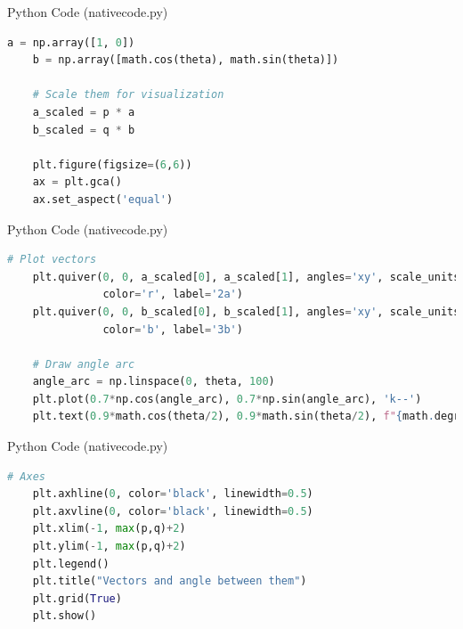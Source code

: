 \documentclass{beamer}
\begin{document}
\begin{frame}[fragile]{Python Code (nativecode.py)}
\begin{lstlisting}[language=Python]
    a = np.array([1, 0])
    b = np.array([math.cos(theta), math.sin(theta)])

    # Scale them for visualization
    a_scaled = p * a
    b_scaled = q * b

    plt.figure(figsize=(6,6))
    ax = plt.gca()
    ax.set_aspect('equal')

\end{lstlisting}
\end{frame}
\begin{frame}[fragile]{Python Code (nativecode.py)}
\begin{lstlisting}[language=Python]
# Plot vectors
    plt.quiver(0, 0, a_scaled[0], a_scaled[1], angles='xy', scale_units='xy', scale=1,
               color='r', label='2a')
    plt.quiver(0, 0, b_scaled[0], b_scaled[1], angles='xy', scale_units='xy', scale=1,
               color='b', label='3b')

    # Draw angle arc
    angle_arc = np.linspace(0, theta, 100)
    plt.plot(0.7*np.cos(angle_arc), 0.7*np.sin(angle_arc), 'k--')
    plt.text(0.9*math.cos(theta/2), 0.9*math.sin(theta/2), f"{math.degrees(theta):.0f}°")
\end{lstlisting}
\end{frame}
\begin{frame}[fragile]{Python Code (nativecode.py)}
\begin{lstlisting}[language=Python]
    # Axes
    plt.axhline(0, color='black', linewidth=0.5)
    plt.axvline(0, color='black', linewidth=0.5)
    plt.xlim(-1, max(p,q)+2)
    plt.ylim(-1, max(p,q)+2)
    plt.legend()
    plt.title("Vectors and angle between them")
    plt.grid(True)
    plt.show()
\end{lstlisting}
\end{frame}
\end{document}
